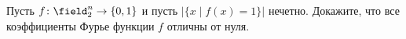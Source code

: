 Пусть $f\colon \field_2^n \to \{0, 1\}$ и пусть $|\{x \mid f(x) = 1\}|$ нечетно. Докажите, что все
коэффициенты Фурье функции $f$ отличны от нуля.